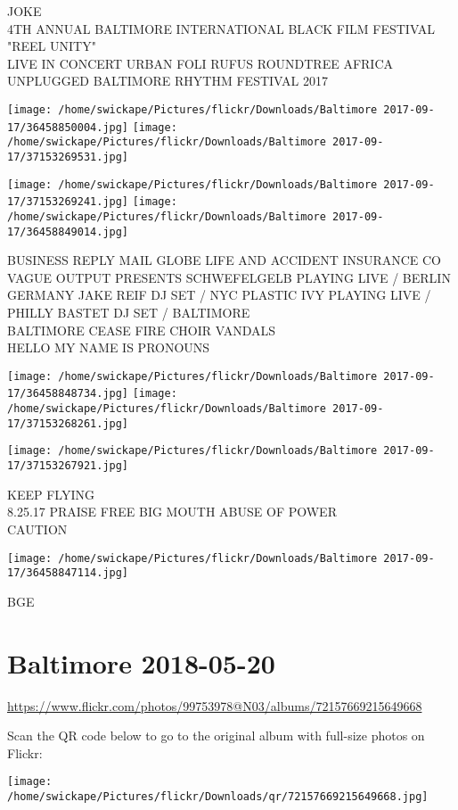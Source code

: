 \documentclass[10pt,letterpaper]{article}
\begin{document}
JOKE\\
4TH ANNUAL BALTIMORE INTERNATIONAL BLACK FILM FESTIVAL "REEL UNITY"\\
LIVE IN CONCERT URBAN FOLI RUFUS ROUNDTREE AFRICA UNPLUGGED BALTIMORE RHYTHM FESTIVAL 2017
\pagebreak

\texttt{[image: /home/swickape/Pictures/flickr/Downloads/Baltimore 2017-09-17/36458850004.jpg]}
\texttt{[image: /home/swickape/Pictures/flickr/Downloads/Baltimore 2017-09-17/37153269531.jpg]}

\texttt{[image: /home/swickape/Pictures/flickr/Downloads/Baltimore 2017-09-17/37153269241.jpg]}
\texttt{[image: /home/swickape/Pictures/flickr/Downloads/Baltimore 2017-09-17/36458849014.jpg]}

BUSINESS REPLY MAIL GLOBE LIFE AND ACCIDENT INSURANCE CO\\
VAGUE OUTPUT PRESENTS SCHWEFELGELB  PLAYING LIVE / BERLIN GERMANY JAKE REIF DJ SET / NYC PLASTIC IVY PLAYING LIVE / PHILLY BASTET DJ SET / BALTIMORE\\
BALTIMORE CEASE FIRE CHOIR VANDALS\\
HELLO MY NAME IS PRONOUNS
\pagebreak

\texttt{[image: /home/swickape/Pictures/flickr/Downloads/Baltimore 2017-09-17/36458848734.jpg]}
\texttt{[image: /home/swickape/Pictures/flickr/Downloads/Baltimore 2017-09-17/37153268261.jpg]}

\texttt{[image: /home/swickape/Pictures/flickr/Downloads/Baltimore 2017-09-17/37153267921.jpg]}

KEEP FLYING\\
8.25.17 PRAISE FREE BIG MOUTH ABUSE OF POWER\\
CAUTION
\pagebreak

\texttt{[image: /home/swickape/Pictures/flickr/Downloads/Baltimore 2017-09-17/36458847114.jpg]}

BGE
\pagebreak

\section*{Baltimore 2018-05-20}

\url{https://www.flickr.com/photos/99753978@N03/albums/72157669215649668}

Scan the QR code below to go to the original album with full-size photos on Flickr:

\texttt{[image: /home/swickape/Pictures/flickr/Downloads/qr/72157669215649668.jpg]}
\pagebreak
\end{document}
